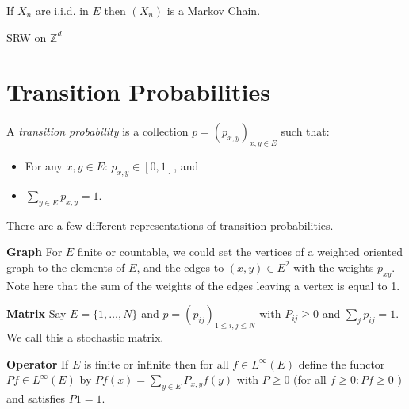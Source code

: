 \begin{ex}
	If $X_n$ are i.i.d. in $E$ then $(X_n)$ is a Markov Chain.
\end{ex}

\begin{ex}
	SRW on $\mathbb{Z}^d$
\end{ex}

\section{Transition Probabilities}

\begin{defn}
	A \emph{transition probability} is a collection $p=(p_{x,y})_{x,y \in E}$ such that:
	\begin{itemize}
		\item For any $x,y \in E$: $p_{x,y}\in [0,1]$, and
		\item $\sum_{y \in E} p_{x,y}=1$.
	\end{itemize}
	
\end{defn}

There are a few different representations of transition probabilities.

\textbf{Graph} For $E$ finite or countable, we could set the vertices of a weighted oriented graph to the elements of $E$, and the edges to $(x,y)\in E^2$ with the weights $p_{xy}$. Note here that the sum of the weights of the edges leaving a vertex is equal to 1.

\textbf{Matrix} Say $E=\{1,\ldots,N\}$ and $p=(p_{ij})_{1\leq i,j\leq N}$ with $P_{ij}\geq 0$ and $\sum_{j}p_{ij}=1$. We call this a stochastic matrix.

\textbf{Operator} If $E$ is finite or infinite then for all $f \in L^\infty (E)$ define the functor $Pf \in L^\infty (E)$ by  $Pf(x)=\sum_{y \in E}P_{x,y}f(y)$ with $P\geq 0 $ (for all $f \geq 0: Pf \geq 0$ ) and satisfies $P1=1$.

